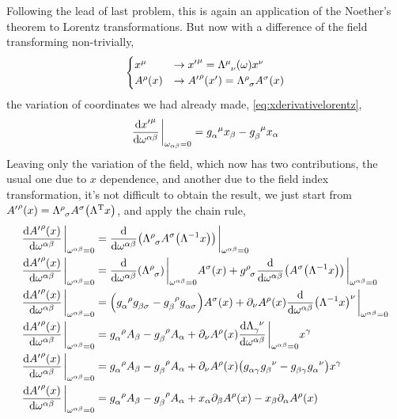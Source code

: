 \problem{}
\label{section:prob5}

Following the lead of last problem, this is again an application of the Noether's theorem to Lorentz transformations. 
But now with a difference of the field transforming non-trivially,
\begin{align}
    \begin{cases}
        x^\mu&\rightarrow {x'}^\mu=\tensor{\Lambda}{^\mu_\nu}\qty(\omega)x^\nu\\
        A^\rho\qty(x)&\rightarrow {A'}^\rho\qty(x')=\tensor{\Lambda}{^\rho_\sigma}A^\sigma\qty(x)
    \end{cases}
\end{align}
the variation of coordinates we had already made, \cref{eq:xderivativelorentz},
\begin{align}
    \dv{{x'}^\mu}{\omega^{\alpha\beta}}\eval_{\omega_{\alpha\beta}=0}=\tensor{g}{_\alpha^\mu}x_\beta-\tensor{g}{_\beta^\mu}x_\alpha
\end{align}
Leaving only the variation of the field, which now has two contributions, the usual one due to $x$ dependence, and 
another due to the field index transformation, it's not difficult to obtain the result, we just start from ${A'}^\rho\qty(x)= \tensor{\Lambda}{^\rho_\sigma}A^\sigma\qty(\Lambda^{\textnormal{T}}x)$, 
and apply the chain rule,
\begin{align}
    \dv{{A'}^\rho\qty(x)}{\omega^{\alpha\beta}}\eval_{\omega^{\alpha\beta}=0}&=\dv{}{\omega^{\alpha\beta}}\qty(\tensor{\Lambda}{^\rho_\sigma}A^\sigma\qty(\Lambda^{-1}x))\eval_{\omega^{\alpha\beta}=0}\\
    \dv{{A'}^\rho\qty(x)}{\omega^{\alpha\beta}}\eval_{\omega^{\alpha\beta}=0}&=\dv{}{\omega^{\alpha\beta}}\qty(\tensor{\Lambda}{^\rho_\sigma})\eval_{\omega^{\alpha\beta}=0}A^\sigma\qty(x)+\tensor{g}{^\rho_\sigma}\dv{}{\omega^{\alpha\beta}}\qty(A^\sigma\qty(\Lambda^{-1}x))\eval_{\omega^{\alpha\beta}=0}\\%
    \dv{{A'}^\rho\qty(x)}{\omega^{\alpha\beta}}\eval_{\omega^{\alpha\beta}=0}&=\qty(\tensor{g}{_\alpha^\rho}\tensor{g}{_\beta_\sigma}-\tensor{g}{_\beta^\rho}\tensor{g}{_\alpha_\sigma})A^\sigma\qty(x)+\partial_\nu A^\rho\qty(x)\dv{}{\omega^{\alpha\beta}}\qty(\Lambda^{-1}x)^\nu\eval_{\omega^{\alpha\beta}=0}\\
    \dv{{A'}^\rho\qty(x)}{\omega^{\alpha\beta}}\eval_{\omega^{\alpha\beta}=0}&=\tensor{g}{_\alpha^\rho}A_\beta-\tensor{g}{_\beta^\rho}A_\alpha+\partial_\nu A^\rho\qty(x)\dv{\tensor{\Lambda}{_\gamma^\nu}}{\omega^{\alpha\beta}}\eval_{\omega^{\alpha\beta}=0}x^\gamma\\
    \dv{{A'}^\rho\qty(x)}{\omega^{\alpha\beta}}\eval_{\omega^{\alpha\beta}=0}&=\tensor{g}{_\alpha^\rho}A_\beta-\tensor{g}{_\beta^\rho}A_\alpha+\partial_\nu A^\rho\qty(x)\qty(\tensor{g}{_\alpha_\gamma}\tensor{g}{_\beta^\nu}-\tensor{g}{_\beta_\gamma}\tensor{g}{_\alpha^\nu})x^\gamma\\
    \dv{{A'}^\rho\qty(x)}{\omega^{\alpha\beta}}\eval_{\omega^{\alpha\beta}=0}&=\tensor{g}{_\alpha^\rho}A_\beta-\tensor{g}{_\beta^\rho}A_\alpha+x_\alpha\partial_\beta A^\rho\qty(x)-x_\beta\partial_\alpha A^\rho\qty(x)
\end{align}
